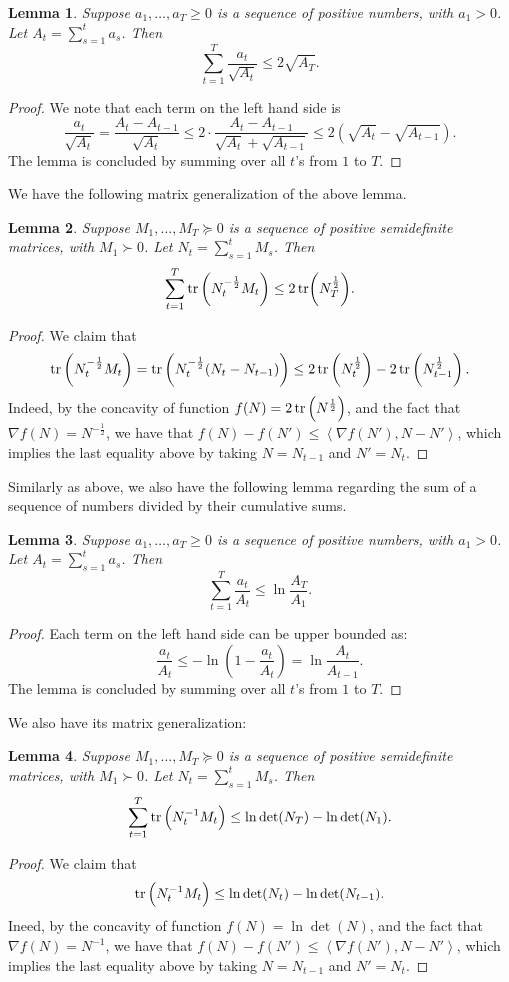 \documentclass{article}
\newtheorem{lemma}{Lemma}
\newcommand{\inner}[2]{\left\langle #1,#2 \right\rangle}
\begin{document}
\begin{lemma}
Suppose $a_1, \ldots, a_T \geq 0$ is a sequence of positive numbers, with $a_1 > 0$. Let $A_t = \sum_{s=1}^t a_s$. Then
\[ \sum_{t=1}^T \frac{a_t}{\sqrt{A_t}} \leq 2\sqrt{A_T}. \]
\label{lem:sca-sqrt}
\end{lemma}
\begin{proof}
We note that each term on the left hand side is
\[ \frac{a_t}{\sqrt{A_t}} = \frac{A_t - A_{t-1}}{\sqrt{A_t}} \leq 2 \cdot \frac{A_t - A_{t-1}}{\sqrt{A_t} + \sqrt{A_{t-1}}} \leq 2(\sqrt{A_t} - \sqrt{A_{t-1}}). \]
The lemma is concluded by summing over all $t$'s from $1$ to $T$.
\end{proof}

We have the following matrix generalization of the above lemma.
\begin{lemma}
  Suppose $M_1, \ldots, M_T \succeq 0$ is a sequence of positive semidefinite matrices, with $M_1 \succ 0$. Let $N_t = \sum_{s=1}^t M_s$. Then
  \[ \sum_{t=1}^T \tr\del{N_t^{-\frac12} M_t} \leq 2\tr(N_T^{\frac12}). \]
  \label{lem:mat-sqrt}
\end{lemma}
\begin{proof}
We claim that
\[ \tr\del{N_t^{-\frac12} M_t} = \tr\del{N_t^{-\frac12} (N_t - N_{t-1})} \leq 2\tr\del{N_t^{\frac12}} - 2\tr\del{N_{t-1}^\frac12}. \]
Indeed, by the concavity of function $f(N) = 2\tr\del{N^{\frac12}}$, and the fact that
$\nabla f(N) = N^{-\frac12}$, we have that $f(N) - f(N') \leq \inner{\nabla f(N')}{N - N'}$, which implies the last equality above by taking $N = N_{t-1}$ and $N' = N_t$.
\end{proof}

Similarly as above, we also have the following lemma regarding the sum of a sequence of
numbers divided by their cumulative sums.

\begin{lemma}
Suppose $a_1, \ldots, a_T \geq 0$ is a sequence of positive numbers, with $a_1 > 0$. Let $A_t = \sum_{s=1}^t a_s$. Then
\[ \sum_{t=1}^T \frac{a_t}{A_t} \leq \ln \frac{A_T}{A_1}. \]
\label{lem:sca-ln}
\end{lemma}
\begin{proof}
Each term on the left hand side can be upper bounded as:
\[ \frac{a_t}{A_t} \leq -\ln(1-\frac{a_t}{A_t}) = \ln\frac{A_t}{A_{t-1}}. \]
The lemma is concluded by summing over all $t$'s from $1$ to $T$.
\end{proof}

We also have its matrix generalization:
\begin{lemma}
  Suppose $M_1, \ldots, M_T \succeq 0$ is a sequence of positive semidefinite matrices, with $M_1 \succ 0$. Let $N_t = \sum_{s=1}^t M_s$. Then
  \[ \sum_{t=1}^T \tr\del{N_t^{-1} M_t} \leq \ln\det(N_T) - \ln\det(N_1). \]
  \label{lem:mat-ln}
\end{lemma}
\begin{proof}
We claim that
\[ \tr\del{N_t^{-1} M_t} \leq \ln\det(N_{t}) - \ln\det(N_{t-1}). \]
Ineed, by the concavity of function $f(N) = \ln\det(N)$, and the fact that $\nabla f(N) = N^{-1}$, we have that $f(N) - f(N') \leq \inner{\nabla f(N')}{N - N'}$, which implies the last equality above by taking $N = N_{t-1}$ and $N' = N_t$.
\end{proof}


\end{document}
